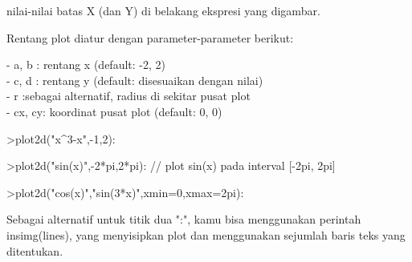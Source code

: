 \documentclass[a4paper,10pt]{article}
\begin{document}
\begin{eulernotebook}
\begin{eulercomment}
\begin{eulercomment}
\begin{eulercomment}
\begin{eulercomment}
\begin{eulercomment}
\begin{eulercomment}
\begin{eulercomment}
\begin{eulercomment}
\begin{eulercomment}
\begin{eulercomment}
\begin{eulercomment}
\begin{eulercomment}
\begin{eulercomment}
\begin{eulercomment}
\begin{eulercomment}
\begin{eulercomment}
\begin{eulercomment}
\begin{eulercomment}
\begin{eulercomment}
\begin{eulercomment}
\begin{eulercomment}
\begin{eulercomment}
\begin{eulercomment}
\begin{eulercomment}
\begin{eulercomment}
\begin{eulercomment}
\begin{eulercomment}
\begin{eulercomment}
\begin{eulercomment}
\begin{eulercomment}
\begin{eulercomment}
\begin{eulercomment}
\begin{eulercomment}
\begin{eulercomment}
\begin{eulercomment}
\begin{eulercomment}
\begin{eulercomment}
nilai-nilai batas X (dan Y) di belakang ekspresi yang digambar.

Rentang plot diatur dengan parameter-parameter berikut:

- a, b  : rentang x (default: -2, 2)\\
- c, d  : rentang y (default: disesuaikan dengan nilai)\\
- r     :sebagai alternatif, radius di sekitar pusat plot\\
- cx, cy: koordinat pusat plot (default: 0, 0)
\end{eulercomment}
\begin{eulerprompt}
>plot2d("x^3-x",-1,2):
\end{eulerprompt}
\begin{eulerprompt}
>plot2d("sin(x)",-2*pi,2*pi): // plot sin(x) pada interval [-2pi, 2pi]
\end{eulerprompt}
\begin{eulerprompt}
>plot2d("cos(x)","sin(3*x)",xmin=0,xmax=2pi):
\end{eulerprompt}
\begin{eulercomment}
Sebagai alternatif untuk titik dua ":", kamu bisa menggunakan perintah
insimg(lines), yang menyisipkan plot dan menggunakan sejumlah baris
teks yang ditentukan.


\end{eulercomment}
\end{eulercomment}
\end{eulercomment}
\end{eulercomment}
\end{eulercomment}
\end{eulercomment}
\end{eulercomment}
\end{eulercomment}
\end{eulercomment}
\end{eulercomment}
\end{eulercomment}
\end{eulercomment}
\end{eulercomment}
\end{eulercomment}
\end{eulercomment}
\end{eulercomment}
\end{eulercomment}
\end{eulercomment}
\end{eulercomment}
\end{eulercomment}
\end{eulercomment}
\end{eulercomment}
\end{eulercomment}
\end{eulercomment}
\end{eulercomment}
\end{eulercomment}
\end{eulercomment}
\end{eulercomment}
\end{eulercomment}
\end{eulercomment}
\end{eulercomment}
\end{eulercomment}
\end{eulercomment}
\end{eulercomment}
\end{eulercomment}
\end{eulercomment}
\end{eulercomment}
\end{eulernotebook}
\end{document}
